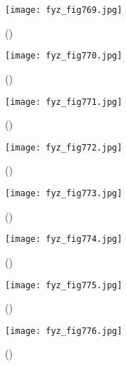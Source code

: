     \begin{figure}[ht!] %
      \centering
      \texttt{[image: fyz\_fig769.jpg]}
      \caption{
               (\cite[s.~707]{Feynman02})}
      \label{fyz:fig769}
    \end{figure}

    \begin{figure}[ht!] %
      \centering
      \texttt{[image: fyz\_fig770.jpg]}
      \caption{
               (\cite[s.~707]{Feynman02})}
      \label{fyz:fig770}
    \end{figure}

    \begin{figure}[ht!] %
      \centering
      \texttt{[image: fyz\_fig771.jpg]}
      \caption{
               (\cite[s.~707]{Feynman02})}
      \label{fyz:fig771}
    \end{figure}

    \begin{figure}[ht!] %
      \centering
      \texttt{[image: fyz\_fig772.jpg]}
      \caption{
               (\cite[s.~707]{Feynman02})}
      \label{fyz:fig772}
    \end{figure}

    \begin{figure}[ht!] %
      \centering
      \texttt{[image: fyz\_fig773.jpg]}
      \caption{
               (\cite[s.~707]{Feynman02})}
      \label{fyz:fig773}
    \end{figure}

    \begin{figure}[ht!] %
      \centering
      \texttt{[image: fyz\_fig774.jpg]}
      \caption{
               (\cite[s.~707]{Feynman02})}
      \label{fyz:fig774}
    \end{figure}

    \begin{figure}[ht!] %
      \centering
      \texttt{[image: fyz\_fig775.jpg]}
      \caption{
               (\cite[s.~707]{Feynman02})}
      \label{fyz:fig775}
    \end{figure}

    \begin{figure}[ht!] %
      \centering
      \texttt{[image: fyz\_fig776.jpg]}
      \caption{
               (\cite[s.~707]{Feynman02})}
      \label{fyz:fig776}
    \end{figure}


